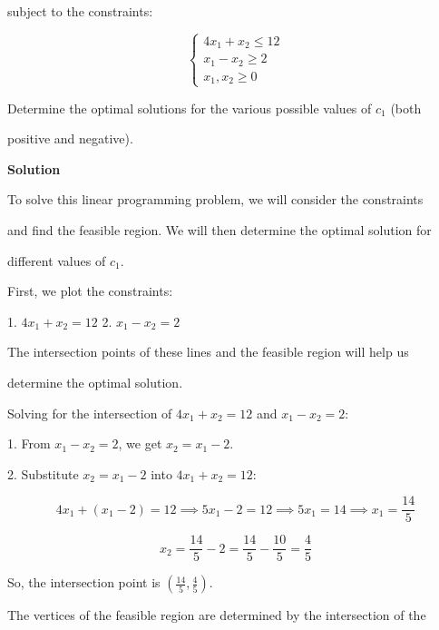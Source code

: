 \documentclass{article}
\begin{document}
subject to the constraints:

\[
\begin{cases}
4x_1 + x_2 \leq 12 \\
x_1 - x_2 \geq 2 \\
x_1, x_2 \geq 0
\end{cases}
\]

Determine the optimal solutions for the various possible values of \( c_1 \) (both 

positive and negative).

\vspace{\baselineskip}

\textbf{Solution}

To solve this linear programming problem, we will consider the constraints 

and find the feasible region. We will then determine the optimal solution for 

different values of \( c_1 \).

\vspace{\baselineskip}

First, we plot the constraints:

\vspace{\baselineskip}

1. \( 4x_1 + x_2 = 12 \)
2. \( x_1 - x_2 = 2 \)

The intersection points of these lines and the feasible region will help us 

determine the optimal solution.

\vspace{\baselineskip}

Solving for the intersection of \( 4x_1 + x_2 = 12 \) and \( x_1 - x_2 = 2 \):

\vspace{\baselineskip}

1. From \( x_1 - x_2 = 2 \), we get \( x_2 = x_1 - 2 \).

2. Substitute \( x_2 = x_1 - 2 \) into \( 4x_1 + x_2 = 12 \):

\[
4x_1 + (x_1 - 2) = 12 \implies 5x_1 - 2 = 12 \implies 5x_1 = 14 \implies x_1 = \frac{14}{5}
\]

\[
x_2 = \frac{14}{5} - 2 = \frac{14}{5} - \frac{10}{5} = \frac{4}{5}
\]

So, the intersection point is \( \left( \frac{14}{5}, \frac{4}{5} \right) \).

\vspace{\baselineskip}

The vertices of the feasible region are determined by the intersection of the 
\end{document}
